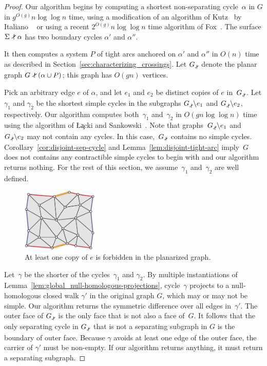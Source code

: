 \begin{proof}
Our algorithm begins by computing a shortest non-separating cycle~$\alpha$ in $G$ in $g^{O(g)}n \log \log n$ time, using a modification of an algorithm of Kutz~\cite{k-csnco-06} by Italiano \etal~\cite{insw-iamcmf-11} or using a recent $2^{O(g)}n \log \log n$ time algorithm of Fox~\cite{f-sntcd-13}.  The surface $\Sigma \snip \alpha$ has two boundary cycles $\alpha'$ and $\alpha''$.

It then computes a system $P$ of tight arcs anchored on $\alpha'$ and $\alpha''$ in $O(n)$ time as described in Section~\ref{sec:characterizing_crossings}.
Let $\Gsnip$ denote the planar graph $G \snip (\alpha \cup P)$; this graph has $O(gn)$ vertices.

Pick an arbitrary edge $e$ of $\alpha$, and let $e_1$ and $e_2$ be distinct copies of $e$ in~$\Gsnip$.  Let $\gamma_1$ and $\gamma_2$ be the shortest simple cycles in the  subgraphs $\Gsnip \backslash e_1$ and $\Gsnip \backslash e_2$, respectively.  Our algorithm computes both~$\gamma_1$ and~$\gamma_2$ in $O(gn \log\log n)$ time using the algorithm of \L\c{a}cki and Sankowski~\cite{ls-mcsc-11}. Note that graphs~$\Gsnip \backslash e_1$ and~$\Gsnip \backslash e_2$ may not contain any cycles. In this case,~$\Gsnip$ contains no simple cycles. Corollary~\ref{cor:disjoint-sep-cycle} and Lemma~\ref{lem:disjoint-tight-arc} imply~$G$ does not contains any contractible simple cycles to begin with and our algorithm returns nothing. For the rest of this section, we assume~$\gamma_1$ and~$\gamma_2$ are well defined.

\begin{figure}[h]
\centering
\includegraphics[height=1.2in]{Fig/forbidden-pair}
\caption{At least one copy of $e$ is forbidden in the planarized graph.}
\label{fig:global_forbidden-pair}
\end{figure}

Let~$\gamma$ be the shorter of the cycles~$\gamma_1$ and $\gamma_2$.  By multiple instantiations of Lemma~\ref{lem:global_null-homologous-projections}, cycle~$\gamma$ projects to a null-homologous closed walk $\gamma'$ in the original graph $G$, which may or may not be simple.
Our algorithm returns the symmetric difference over all edges in~$\gamma'$. The outer face of $\Gsnip$ is the only face that is not also a face of~$G$.
It follows that the only separating cycle in $\Gsnip$ that is not a separating subgraph in $G$ is the boundary of outer face.  Because $\gamma$ avoids at least one edge of the outer face, the carrier of $\gamma'$ must be non-empty. If our algorithm returns anything, it must return a separating subgraph.


\end{proof}
